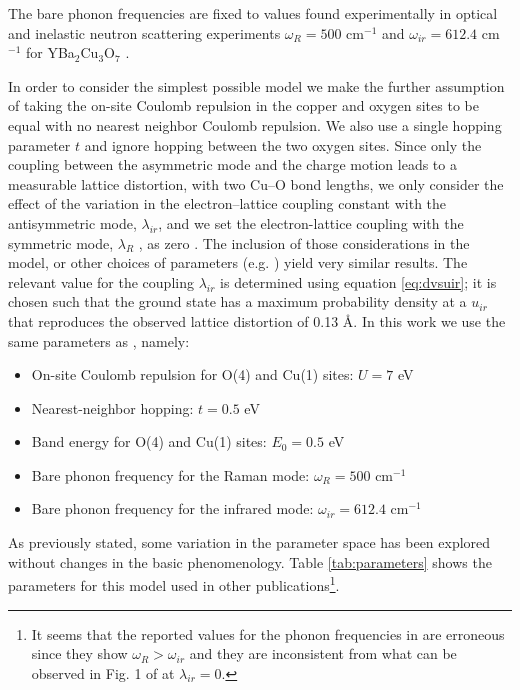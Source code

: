 The bare phonon frequencies are fixed to values found experimentally in optical and inelastic neutron scattering experiments $\omega_R = 500$ cm$^{-1}$ and $\omega_{ir} = 612.4$ cm$^{-1}$ for YBa$_2$Cu$_3$O$_7$ \cite{?}.

In order to consider the simplest possible model we make the further assumption of taking the on-site Coulomb repulsion in the copper and oxygen sites to be equal with no nearest neighbor Coulomb repulsion. 
We also use a single hopping parameter $t$ and ignore hopping between the two oxygen sites. 
Since only the coupling between the asymmetric mode and the charge motion leads to a measurable lattice distortion, with two Cu–O bond lengths, we only consider the effect of the variation in the electron–lattice coupling constant with the antisymmetric mode, $\lambda_{ir}$, and we set the electron-lattice coupling with the symmetric mode, $\lambda_R$ , as zero \cite{Salkola1995}. 
The inclusion of those considerations in the model, or other choices of parameters (e.g. \cite{Salkola1994, Salkola1995}) yield very similar results.
The relevant value for the coupling $\lambda_{ir}$ is determined using equation \ref{eq:dvsuir}; it is chosen such that the ground state has a maximum probability density at a $u_{ir}$ that reproduces the observed lattice distortion of 0.13 \AA \cite{?}.
In this work we use the same parameters as \cite{DeLeon1999, Leon2008, MirandaMena2007,Mena2006}, namely:

\begin{itemize}
\item On-site Coulomb repulsion for O(4) and Cu(1) sites: $U=7$ eV
\item Nearest-neighbor hopping: $t=0.5$ eV
\item Band energy for O(4) and Cu(1) sites: $E_0=0.5$ eV
\item Bare phonon frequency for the Raman mode: $\omega_R=500$ cm$^{-1}$
\item Bare phonon frequency for the infrared mode: $\omega_{ir}=612.4$ cm$^{-1}$
\end{itemize}

As previously stated, some variation in the parameter space has been explored without changes in the basic phenomenology. Table \ref{tab:parameters} shows the parameters for this model used in other publications\footnote{It seems that the reported values for the phonon frequencies in \cite{Salkola1994, Salkola1995} are erroneous since they show $\omega_R > \omega_{ir}$ and they are inconsistent from what can be observed in Fig. 1 of \cite{Salkola1994} at $\lambda_{ir}=0$.}.

